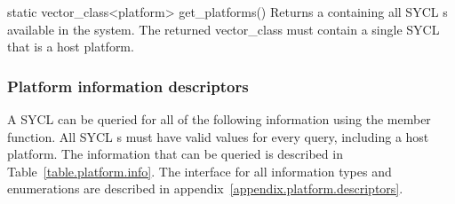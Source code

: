   \addRow
    {static vector_class<platform> get_platforms()}
    {
      Returns a  containing all SYCL s available in the system. The returned vector_class must contain a single SYCL  that is a host platform.
    }
\completeTable

\subsubsection{Platform information descriptors}

A SYCL  can be queried for all of the following information using the  member function. All SYCL s must have valid values for every query, including a host platform. The information that can be queried is described in Table~\ref{table.platform.info}. The interface for all information types and enumerations are described in appendix~\ref{appendix.platform.descriptors}.



